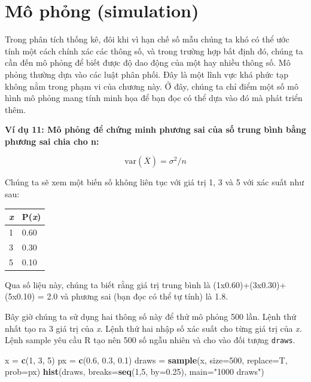 \documentclass[
]{book}
\newenvironment{Shaded}{\begin{snugshade}}{\end{snugshade}}
\newcommand{\DataTypeTok}[1]{\textcolor[rgb]{0.13,0.29,0.53}{#1}}
\newcommand{\DecValTok}[1]{\textcolor[rgb]{0.00,0.00,0.81}{#1}}
\newcommand{\FloatTok}[1]{\textcolor[rgb]{0.00,0.00,0.81}{#1}}
\newcommand{\KeywordTok}[1]{\textcolor[rgb]{0.13,0.29,0.53}{\textbf{#1}}}
\newcommand{\NormalTok}[1]{#1}
\newcommand{\StringTok}[1]{\textcolor[rgb]{0.31,0.60,0.02}{#1}}
\begin{document}
\hypertarget{muxf4-phux1ecfng-simulation}{%
\section{Mô phỏng (simulation)}\label{muxf4-phux1ecfng-simulation}}

Trong phân tích thống kê, đôi khi vì hạn chế số mẫu chúng ta khó có thể ước tính một cách chính xác các thông số, và trong trường hợp bất định đó, chúng ta cần đến mô phỏng để biết được độ dao động của một hay nhiều thông số. Mô phỏng thường dựa vào các luật phân phối. Đây là một lĩnh vực khá phức tạp không nằm trong phạm vi của chương này. Ở đây, chúng ta chỉ điểm một số mô hình mô phỏng mang tính minh họa để bạn đọc có thể dựa vào đó mà phát triển thêm.

\textbf{Ví dụ 11: Mô phỏng để chứng minh phương sai của số trung bình bằng
phương sai chia cho n:}

\[\text{var}\left( \overline{X} \right) = \sigma^{2}/n\]

Chúng ta sẽ xem một biến số không liên tục với giá trị 1, 3 và 5 với xác suất như sau:

\begin{longtable}[]{@{}ll@{}}
\toprule
\emph{x} & P(\emph{x})\tabularnewline
\midrule
\endhead
1 & 0.60\tabularnewline
3 & 0.30\tabularnewline
5 & 0.10\tabularnewline
\bottomrule
\end{longtable}

Qua số liệu này, chúng ta biết rằng giá trị trung bình là (1x0.60)+(3x0.30)+(5x0.10) = 2.0 và phương sai (bạn đọc có thể tự tính) là 1.8.

Bây giờ chúng ta sử dụng hai thông số này để thử mô phỏng 500 lần. Lệnh thứ nhất tạo ra 3 giá trị của \emph{x}. Lệnh thứ hai nhập số xác suất cho từng giá trị của \emph{x.} Lệnh sample yêu cầu R tạo nên 500 số ngẫu nhiên và cho vào đối tượng \texttt{draws}.

\begin{Shaded}
\begin{Highlighting}[]
\NormalTok{x =}\StringTok{ }\KeywordTok{c}\NormalTok{(}\DecValTok{1}\NormalTok{, }\DecValTok{3}\NormalTok{, }\DecValTok{5}\NormalTok{)}
\NormalTok{px =}\StringTok{ }\KeywordTok{c}\NormalTok{(}\FloatTok{0.6}\NormalTok{, }\FloatTok{0.3}\NormalTok{, }\FloatTok{0.1}\NormalTok{)}
\NormalTok{draws =}\StringTok{ }\KeywordTok{sample}\NormalTok{(x, }\DataTypeTok{size=}\DecValTok{500}\NormalTok{, }\DataTypeTok{replace=}\NormalTok{T, }\DataTypeTok{prob=}\NormalTok{px)}
\KeywordTok{hist}\NormalTok{(draws, }\DataTypeTok{breaks=}\KeywordTok{seq}\NormalTok{(}\DecValTok{1}\NormalTok{,}\DecValTok{5}\NormalTok{, }\DataTypeTok{by=}\FloatTok{0.25}\NormalTok{), }\DataTypeTok{main=}\StringTok{"1000 draws"}\NormalTok{)}
\end{Highlighting}
\end{Shaded}
\end{document}
